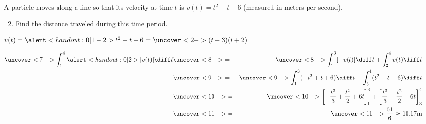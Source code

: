 \begin{frame}[t]
\begin{example}[Example 6, p. 328]
A particle moves along a line so that its velocity at time $t$ is \alert<handout:0| 2>{$v(t) = t^2 - t - 6$} (measured in meters per second).
\begin{enumerate}
\setcounter{enumi}{1}
\item  Find the distance traveled during this time period.
\end{enumerate}
$v(t) = \alert<handout:0| 1-2>{t^2 - t - 6 = \uncover<2->{(t-3)(t+2)}}$ %
%

%
\abovedisplayskip=0pt
\belowdisplayskip=0pt
\begin{eqnarray*}
\uncover<7->{ \int_1^4 \alert<handout:0| 2>{|v(t)|} \diff t }%
& \uncover<8->{=} & \uncover<8->{ \int_1^3 [-v(t)]\diff t + \int_3^4 v(t) \diff t}\\%
& \uncover<9->{=} & \uncover<9->{ \int_1^3 (-t^2 + t + 6 )\diff t + \int_3^4 (t^2 - t - 6) \diff t}\\%
& \uncover<10->{=} & \uncover<10->{ \left[ -\frac{t^3}{3} + \frac{t^2}{2} + 6t\right]_1^3 + \left[ \frac{t^3}{3} - \frac{t^2}{2} - 6t\right]_3^4}\\%
& \uncover<11->{=} & \uncover<11->{ \frac{61}{6} \approx 10.17\textrm{m}} 
\end{eqnarray*}
\end{example}
\end{frame}

